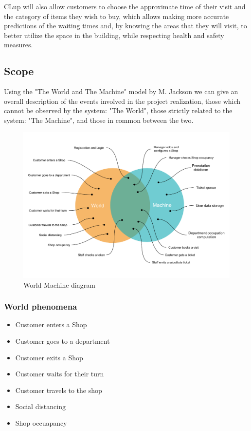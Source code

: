 CLup will also allow customers to choose the approximate time of their visit and the category of items they wish to buy, which allows making more accurate predictions of the waiting times and, by knowing the areas that they will visit, to better utilize the space in the building, while respecting health and safety measures.

\subsection{Scope}

Using the "The World and The Machine" model by M. Jackson we can give an overall description of the events involved in the project realization, those which cannot be observed by the system: "The World", those strictly related to the system: "The Machine", and those in common between the two.

\begin{figure}[h]
    \centering
    \includegraphics[width=.85\textwidth]{Images/world-machine.pdf}
    \caption{\label{fig:world_machine} World Machine diagram}
\end{figure}

\subsubsection{World phenomena}
\begin{itemize}
    \item Customer enters a Shop
    \item Customer goes to a department
    \item Customer exits a Shop
    \item Customer waits for their turn
    \item Customer travels to the shop
    \item Social distancing
    \item Shop occuapancy
\end{itemize}

